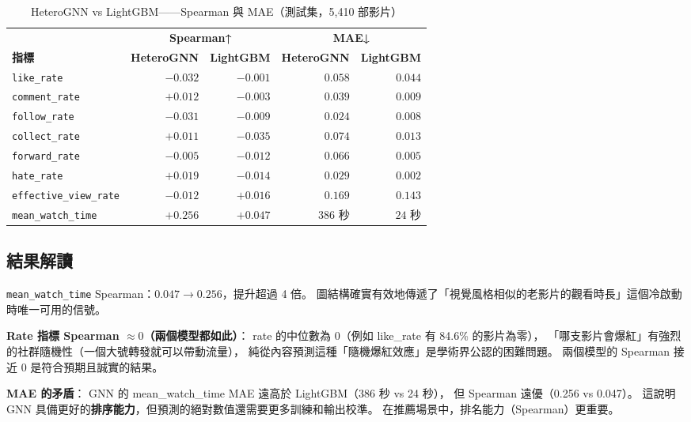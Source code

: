 \documentclass[12pt, a4paper]{article}
\begin{document}
\begin{table}[H]
\centering
\caption{HeteroGNN vs LightGBM——Spearman 與 MAE（測試集，5,410 部影片）}
\label{tab:results}
\small
\begin{tabular}{lrrrr}
\toprule
& \multicolumn{2}{c}{\textbf{Spearman↑}} & \multicolumn{2}{c}{\textbf{MAE↓}} \\
\cmidrule(lr){2-3}\cmidrule(lr){4-5}
\textbf{指標} & \textbf{HeteroGNN} & \textbf{LightGBM}
              & \textbf{HeteroGNN} & \textbf{LightGBM} \\
\midrule
\texttt{like\_rate}            & $-0.032$ & $-0.001$ & $0.058$ & $0.044$ \\
\texttt{comment\_rate}         & $+0.012$ & $-0.003$ & $0.039$ & $0.009$ \\
\texttt{follow\_rate}          & $-0.031$ & $-0.009$ & $0.024$ & $0.008$ \\
\texttt{collect\_rate}         & $+0.011$ & $-0.035$ & $0.074$ & $0.013$ \\
\texttt{forward\_rate}         & $-0.005$ & $-0.012$ & $0.066$ & $0.005$ \\
\texttt{hate\_rate}            & $+0.019$ & $-0.014$ & $0.029$ & $0.002$ \\
\texttt{effective\_view\_rate} & $-0.012$ & $+0.016$ & $0.169$ & $0.143$ \\
\texttt{mean\_watch\_time}     & $\mathbf{+0.256}$ & $+0.047$ & $386$ 秒 & $24$ 秒 \\
\bottomrule
\end{tabular}
\end{table}

\subsection{結果解讀}

\begin{tipbox}[最重要的發現]
\texttt{mean\_watch\_time} Spearman：$0.047 \to \mathbf{0.256}$，提升超過 4 倍。
圖結構確實有效地傳遞了「視覺風格相似的老影片的觀看時長」這個冷啟動時唯一可用的信號。
\end{tipbox}

\textbf{Rate 指標 Spearman $\approx 0$（兩個模型都如此）}：
rate 的中位數為 0（例如 like\_rate 有 84.6\% 的影片為零），
「哪支影片會爆紅」有強烈的社群隨機性（一個大號轉發就可以帶動流量），
純從內容預測這種「隨機爆紅效應」是學術界公認的困難問題。
兩個模型的 Spearman 接近 0 是符合預期且誠實的結果。

\textbf{MAE 的矛盾}：
GNN 的 mean\_watch\_time MAE 遠高於 LightGBM（386 秒 vs 24 秒），
但 Spearman 遠優（0.256 vs 0.047）。
這說明 GNN 具備更好的\textbf{排序能力}，但預測的絕對數值還需要更多訓練和輸出校準。
在推薦場景中，排名能力（Spearman）更重要。
\end{document}
